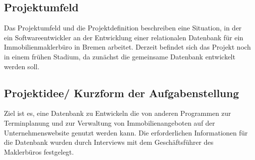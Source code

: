 
\subsection{Projektumfeld}
Das Projektumfeld und die Projektdefinition beschreiben eine Situation, in der ein Softwareentwickler an der
Entwicklung einer relationalen Datenbank für ein Immobilienmaklerbüro in Bremen arbeitet.
Derzeit befindet sich das Projekt noch in einem frühen Stadium, da zunächst die gemeinsame Datenbank entwickelt werden soll.
\subsection{Projektidee/ Kurzform der Aufgabenstellung}
Ziel ist es, eine Datenbank zu Entwickeln die von anderen Programmen zur Terminplanung und zur Verwaltung von
Immobilienangeboten auf der Unternehmenswebsite genutzt werden kann.
Die erforderlichen Informationen für die Datenbank wurden durch Interviews mit dem Geschäftsführer des Maklerbüros festgelegt.

